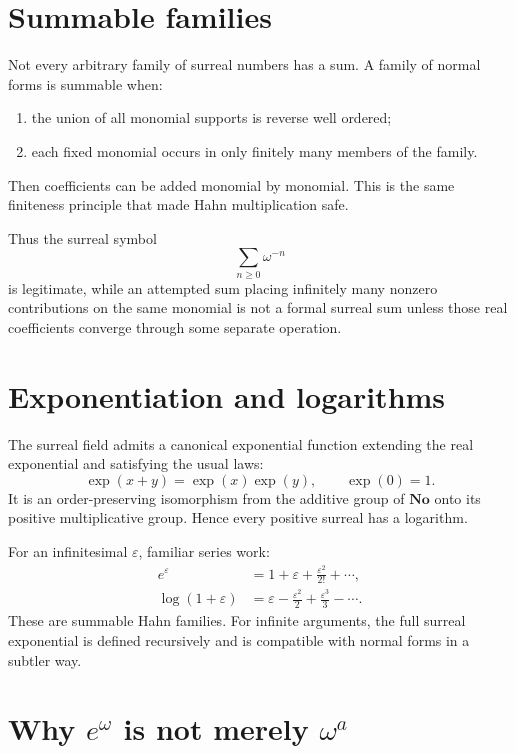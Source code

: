 \documentclass[11pt,openany]{book}
\theoremstyle{definition}
\theoremstyle{plain}
\theoremstyle{remark}
\begin{document}
\section{Summable families}

Not every arbitrary family of surreal numbers has a sum. A family of normal forms is summable when:
\begin{enumerate}
 \item the union of all monomial supports is reverse well ordered;
 \item each fixed monomial occurs in only finitely many members of the family.
\end{enumerate}
Then coefficients can be added monomial by monomial. This is the same finiteness principle that made Hahn multiplication safe.

Thus the surreal symbol
\[
 \sum_{n\ge0}\omega^{-n}
\]
is legitimate, while an attempted sum placing infinitely many nonzero contributions on the same monomial is not a formal surreal sum unless those real coefficients converge through some separate operation.

\section{Exponentiation and logarithms}

The surreal field admits a canonical exponential function extending the real exponential and satisfying the usual laws:
\[
 \exp(x+y)=\exp(x)\exp(y),
 \qquad
 \exp(0)=1.
\]
It is an order-preserving isomorphism from the additive group of $\mathbf{No}$ onto its positive multiplicative group. Hence every positive surreal has a logarithm.

For an infinitesimal $\varepsilon$, familiar series work:
\begin{align*}
 e^\varepsilon
 &=1+\varepsilon+\frac{\varepsilon^2}{2!}+\cdots,\\
 \log(1+\varepsilon)
 &=\varepsilon-\frac{\varepsilon^2}{2}
 +\frac{\varepsilon^3}{3}-\cdots.
\end{align*}
These are summable Hahn families. For infinite arguments, the full surreal exponential is defined recursively and is compatible with normal forms in a subtler way.

\section{Why \texorpdfstring{$e^\omega$}{exp(omega)} is not merely \texorpdfstring{$\omega^a$}{omega^a}}
\end{document}
